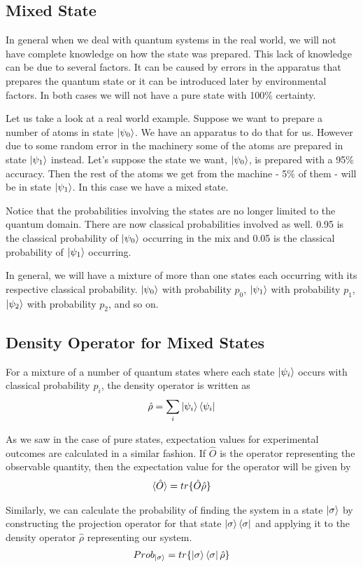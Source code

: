 \subsection{Mixed State}
\par In general when we deal with quantum systems in the real world, we will not have complete knowledge on how the state was prepared. This lack of knowledge can be due to several factors. It can be caused by errors in the apparatus that prepares the quantum state or it can be introduced later by environmental factors. In both cases we will not have a pure state with 100\% certainty.
\par Let us take a look at a real world example. Suppose we want to prepare a number of atoms in state $\ket{\psi_0}$. We have an apparatus to do that for us. However due to some random error in the machinery some of the atoms are prepared in state $\ket{\psi_1}$ instead. Let's suppose the state we want, $\ket{\psi_0}$, is prepared with a 95\% accuracy. Then the rest of the atoms we get from the machine - 5\% of them - will be in state $\ket{\psi_1}$. In this case we have a mixed state.
\par Notice that the probabilities involving the states are no longer limited to the quantum domain. There are now classical probabilities involved as well. 0.95 is the classical probability of $\ket{\psi_0}$ occurring in the mix and 0.05 is the classical probability of $\ket{\psi_1}$ occurring.
\par In general, we will have a mixture of more than one states each occurring with its respective classical probability. $\ket{\psi_0}$ with probability $p_0$, $\ket{\psi_1}$ with probability $p_1$, $\ket{\psi_2}$ with probability $p_2$, and so on.

\subsection{Density Operator for Mixed States}
\par For a mixture of a number of quantum states where each state $\ket{\psi_i}$ occurs with classical probability $p_i$, the density operator is written as
\begin{align*}
\hat{\rho} = \sum_i \ket{\psi_i} \bra{\psi_i}
\end{align*}
\par As we saw in the case of pure states, expectation values for experimental outcomes are calculated in a similar fashion. If $\hat{O}$ is the operator representing the observable quantity, then the expectation value for the operator will be given by
\begin{align*}
\braket{\hat{O}} = tr\{\hat{O}\hat{\rho}\}
\end{align*}
\par Similarly, we can calculate the probability of finding the system in a state $\ket{\sigma}$ by constructing the projection operator for that state $\ket{\sigma} \bra{\sigma}$ and applying it to the density operator $\hat{\rho}$ representing our system.
\begin{align*}
Prob_{\ket{\sigma}} = tr\{ \ket{\sigma} \bra{\sigma} \hat{\rho} \}
\end{align*}

